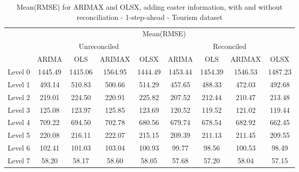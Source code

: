 \documentclass[11pt,a4paper,]{article}
\begin{document}
\begin{table}[t]

\caption{\label{tab:easterroolingRMSE}Mean(RMSE) for ARIMAX and OLSX, adding easter information, with and without reconciliation - 1-step-ahead - Tourism dataset}
\centering
\begin{tabular}{ccccccccc}
\toprule
\multicolumn{1}{c}{} & \multicolumn{8}{c}{Mean(RMSE)} \\
\cmidrule(l{2pt}r{2pt}){2-9}
\multicolumn{1}{c}{} & \multicolumn{4}{c}{Unreconciled} & \multicolumn{4}{c}{Reconciled} \\
\cmidrule(l{2pt}r{2pt}){2-5} \cmidrule(l{2pt}r{2pt}){6-9}
 & ARIMA & OLS & ARIMAX & OLSX & ARIMA & OLS & ARIMAX & OLSX\\
\midrule
Level 0 & 1445.49 & 1415.06 & 1564.95 & 1444.49 & 1453.44 & 1454.39 & 1546.53 & 1487.23\\
Level 1 & 493.14 & 510.83 & 500.66 & 514.29 & 457.65 & 488.33 & 472.03 & 492.68\\
Level 2 & 219.01 & 224.50 & 220.91 & 225.82 & 207.52 & 212.44 & 210.47 & 213.48\\
Level 3 & 125.08 & 123.97 & 125.85 & 123.69 & 120.52 & 119.52 & 121.02 & 119.44\\
Level 4 & 709.22 & 694.50 & 702.78 & 680.56 & 679.74 & 678.54 & 682.92 & 662.45\\
Level 5 & 220.08 & 216.11 & 222.07 & 215.15 & 209.39 & 211.13 & 211.45 & 209.55\\
Level 6 & 102.41 & 101.03 & 103.04 & 100.93 & 99.77 & 98.56 & 100.53 & 98.49\\
Level 7 & 58.20 & 58.17 & 58.60 & 58.05 & 57.68 & 57.20 & 58.04 & 57.15\\
\bottomrule
\end{tabular}
\end{table}
\end{document}
